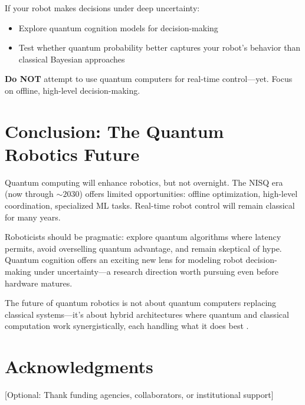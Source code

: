 \documentclass[conference]{IEEEtran}
\begin{document}
If your robot makes decisions under deep uncertainty:

\begin{itemize}
\item Explore quantum cognition models for decision-making \cite{b49, b62}
\item Test whether quantum probability better captures your robot's behavior than classical Bayesian approaches
\end{itemize}

\textbf{Do NOT} attempt to use quantum computers for real-time control---yet. Focus on offline, high-level decision-making.

\section{Conclusion: The Quantum Robotics Future}

Quantum computing will enhance robotics, but not overnight. The NISQ era (now through $\sim2030$) offers limited opportunities: offline optimization, high-level coordination, specialized ML tasks. Real-time robot control will remain classical for many years.

Roboticists should be pragmatic: explore quantum algorithms where latency permits, avoid overselling quantum advantage, and remain skeptical of hype. Quantum cognition offers an exciting new lens for modeling robot decision-making under uncertainty---a research direction worth pursuing even before hardware matures.

The future of quantum robotics is not about quantum computers replacing classical systems---it's about hybrid architectures where quantum and classical computation work synergistically, each handling what it does best \cite{b7, b20, b9}.

\section*{Acknowledgments}

[Optional: Thank funding agencies, collaborators, or institutional support]
\end{document}
